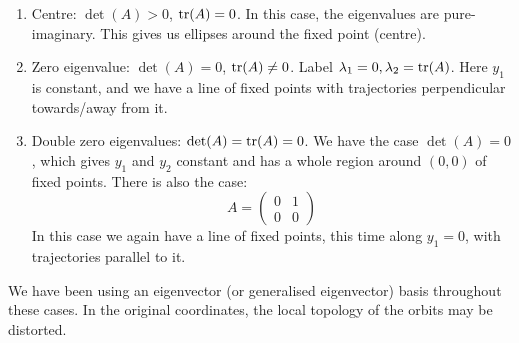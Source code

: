 \documentclass[../Main.tex]{subfiles}
\begin{document}
\begin{enumerate}
\begin{enumerate}
                \begin{equation*}
                    A = 
                    \begin{pmatrix}
                        \lambda & 1 \\
                        0 & \lambda
                    \end{pmatrix}.
                \end{equation*}
                We solve this case to give:
                \begin{equation*}
                    y_1 = \left(y_{1, 0} + y_{2, 0} t\right) e^{\lambda t},\qquad y_2 = y_{2, 0} e^{\lambda t}
                \end{equation*}
                See figure~\ref{figImproperNodePS}
        \end{enumerate}
    \item Centre: $\det(A) > 0$, $\operatorname{tr}(A) = 0$.
        In this case, the eigenvalues are pure-imaginary. This gives us ellipses around the fixed point (centre).
    \item Zero eigenvalue: $\det(A) = 0$, $\operatorname{tr}(A) \neq 0$. Label $\lambda_1 = 0, \lambda_2 = \operatorname{tr}(A)$. Here $y_1$ is constant, and we have a line of fixed points with trajectories perpendicular towards/away from it.
    \item Double zero eigenvalues: $\det(A) = \operatorname{tr}(A) = 0$. We have the case $\det(A) = 0$, which gives $y_1$ and $y_2$ constant and has a whole region around $(0, 0)$ of fixed points. There is also the case:
        \begin{equation*}
            A =
            \begin{pmatrix}
                0 & 1 \\
                0 & 0
            \end{pmatrix}
        \end{equation*}
        In this case we again have a line of fixed points, this time along $y_1 = 0$, with trajectories parallel to it.
\end{enumerate}
We have been using an eigenvector (or generalised eigenvector) basis throughout these cases. In the original coordinates, the local topology of the orbits may be distorted.
\end{document}
